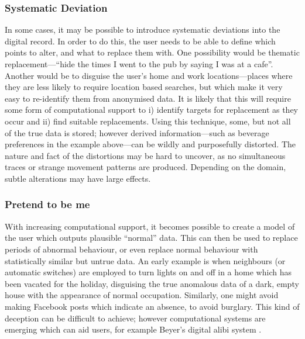 \documentclass{IOS-Book-Article}     %
\newcommand{\tbox}[3][red]{{
\color{#1}\noindent{
   \fbox{\scriptsize{ {\bf #2} \textsl{#3}}}
   \vspace{2pt}
}
}}
\newcommand{\todo}[1]{\tbox{TODO:}{#1}}
\begin{document}
\subsubsection{Systematic Deviation}

In some cases, it may be possible to introduce systematic deviations into the
digital record. In order to do this, the user needs to be able to define which
points to alter, and what to replace them with. One possibility would be
thematic replacement---``hide the times I went to the pub by saying I
was at a cafe''. Another would be to disguise the user's home and work
locations---places where they are less likely to require location based
searches, but which make it very easy to re-identify them from anonymised data.
It is likely that this will require some form of computational support to i) identify targets for replacement as they occur and ii) find suitable replacements. Using this technique, some, but not all of the true data is stored; however derived information---such as beverage preferences in the
example above---can be wildly and purposefully distorted. The nature and fact of
the distortions may be hard to uncover, as no simultaneous traces or
strange movement patterns are produced. Depending on the domain, subtle
alterations may have large effects.

\subsubsection{Pretend to be me}

With increasing computational support, it becomes possible to create a model of
the user which outputs plausible ``normal'' data. This can then be used to
replace periods of abnormal behaviour, or even replace normal behaviour with
statistically similar but untrue data. An early example is when neighbours (or
automatic switches) are employed to turn lights on and off in a home which has
been vacated for the holiday, disguising the true anomalous data of a dark,
empty house with the appearance of normal occupation. Similarly, one might avoid
making Facebook posts which indicate an absence, to avoid burglary. This kind of
deception can be difficult to achieve; however computational systems are
emerging which can aid users, for example Beyer's digital alibi system
\cite{beyer2014Alibi}.
\end{document}
